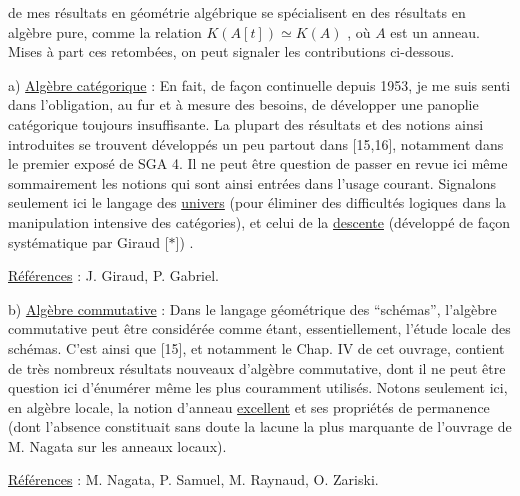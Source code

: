 
de mes résultats en géométrie algébrique se spécialisent
en des résultats en algèbre pure, comme la relation
$K(A[t]) \simeq K(A)$ , où $A$ est un anneau. Mises à part
ces retombées, on peut signaler les contributions ci-dessous.

a) \uline{Algèbre catégorique} : En fait, de façon continuelle
depuis 1953, je me suis senti dans l'obligation, au
fur et à mesure des besoins, de développer une panoplie
catégorique toujours insuffisante. La plupart des
résultats et des notions ainsi introduites se trouvent
développés un peu partout dans [15,16], notamment dans
le premier exposé de SGA 4. Il ne peut être question
de passer en revue ici même sommairement les notions
qui sont ainsi entrées dans l'usage courant. Signalons
seulement ici le langage des \uline{univers} (pour éliminer
des difficultés logiques dans la manipulation intensive
des catégories), et celui de la \uline{descente} (développé de
façon systématique par Giraud [$*$]) .

\uline{Références} : J. Giraud, P. Gabriel.

b) \uline{Algèbre commutative} : Dans le langage géométrique
des ``schémas'', l'algèbre commutative peut être considérée
comme étant, essentiellement, l'étude locale des schémas.
C'est ainsi que [15], et notamment le Chap. IV de cet
ouvrage, contient de très nombreux résultats nouveaux
d'algèbre commutative, dont il ne peut être question
ici d'énumérer même les plus couramment utilisés. Notons
seulement ici, en algèbre locale, la notion d'anneau
\uline{excellent} et ses propriétés de permanence (dont l'absence
constituait sans doute la lacune la plus marquante de
l'ouvrage de M. Nagata sur les anneaux locaux).

\uline{Références} : M. Nagata, P. Samuel, M. Raynaud, O. Zariski.

